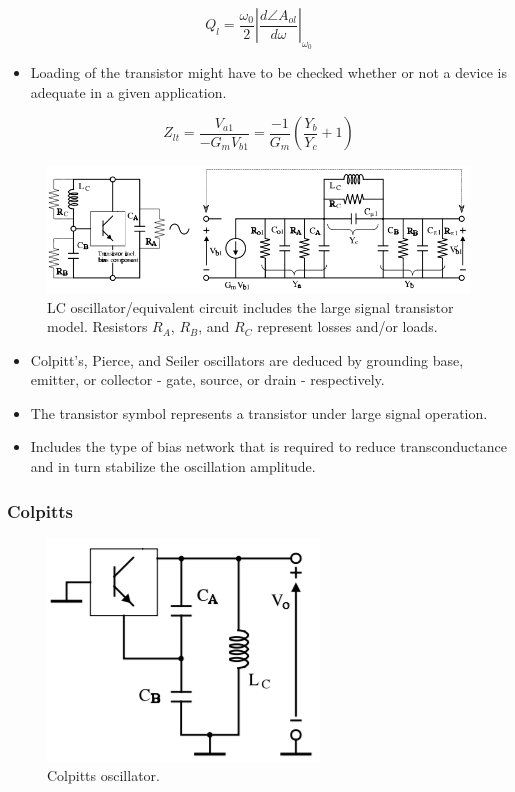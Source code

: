 \begin{equation}
Q_l = \dfrac{\omega_0}{2}\left|\dfrac{d\angle A_{ol}}{d\omega}\right|_{\omega_0}
\end{equation}

\begin{itemize}
	\item Loading of the transistor might have to be checked whether or not a device is adequate in a given application.
\end{itemize}

\begin{equation}
Z_{lt}=\dfrac{V_{a1}}{-G_mV_{b1}}=\dfrac{-1}{G_m}\left(\dfrac{Y_b}{Y_c}+1\right)
\end{equation}

\begin{figure} [H]
	\centering
	\includegraphics[width=\linewidth]{graphics/48.png}
	\caption{LC oscillator/equivalent circuit includes the large signal transistor model. Resistors $R_A$, $R_B$, and $R_C$ represent losses and/or loads.}
	\label{fig:48}
\end{figure}

\begin{itemize}
	\item Colpitt's, Pierce, and Seiler oscillators are deduced by grounding base, emitter, or collector - gate, source, or drain - respectively.
	\item The transistor symbol represents a transistor under large signal operation.
	\item Includes the type of bias network that is required to reduce transconductance and in turn stabilize the oscillation amplitude.
\end{itemize}

\subsubsection{Colpitts}
\begin{figure} [H]
	\centering
	\includegraphics[width=0.45\linewidth]{graphics/42.png}
	\caption{Colpitts oscillator.}
	\label{fig:42}
\end{figure}

